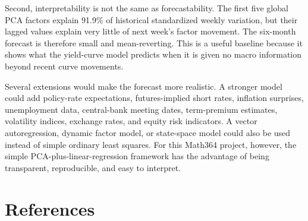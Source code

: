 \documentclass[11pt]{article}
\begin{document}
Second, interpretability is not the same as forecastability. The first five global PCA factors explain 91.9\% of historical standardized weekly variation, but their lagged values explain very little of next week's factor movement. The six-month forecast is therefore small and mean-reverting. This is a useful baseline because it shows what the yield-curve model predicts when it is given no macro information beyond recent curve movements.

Several extensions would make the forecast more realistic. A stronger model could add policy-rate expectations, futures-implied short rates, inflation surprises, unemployment data, central-bank meeting dates, term-premium estimates, volatility indices, exchange rates, and equity risk indicators. A vector autoregression, dynamic factor model, or state-space model could also be used instead of simple ordinary least squares. For this Math364 project, however, the simple PCA-plus-linear-regression framework has the advantage of being transparent, reproducible, and easy to interpret.

\clearpage

\section*{References}
\end{document}
